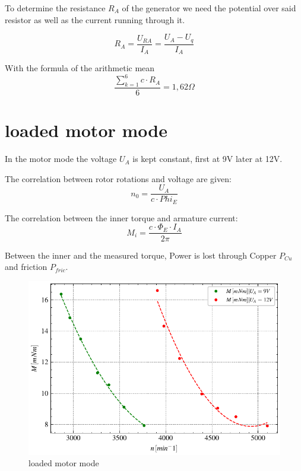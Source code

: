 \documentclass[conference]{IEEEtran}
\begin{document}
To determine the resistance $R_A$ of the generator we need the potential over said resistor as well as the current running through it.

\begin{equation}
    R_A = \frac{U_{RA}}{I_A} = \frac{U_A - U_q}{I_A}
\end{equation}

With the formula of the arithmetic mean
\begin{equation}
    \frac{ \sum\limits_{k = 1}^{6} c \cdot R_A}{6} = 1,62 \Omega
\end{equation}


\section{loaded motor mode}
In the motor mode the voltage $U_A$ is kept constant, first at 9V later at 12V.

The correlation between rotor rotations and voltage are given:
\begin{equation}
    n_0 = \frac{U_A}{c \cdot Phi_E}
\end{equation}

The correlation between the inner torque and armature current:
\begin{equation}
    M_i = \frac{c \cdot \Phi_E \cdot I_A}{2 \pi}
\end{equation}

Between the inner and the measured torque, Power is lost through Copper $P_{Cu}$ and friction $ P_{fric}$.






\begin{figure}[htbp]
    \centering
    \includegraphics[width=\columnwidth]{plots/4.3_Belasteter_Motor_UA9V_12V.pdf}
    \caption{loaded motor mode}
    \label{fig:Anlaufmoment}
\end{figure}
\end{document}
